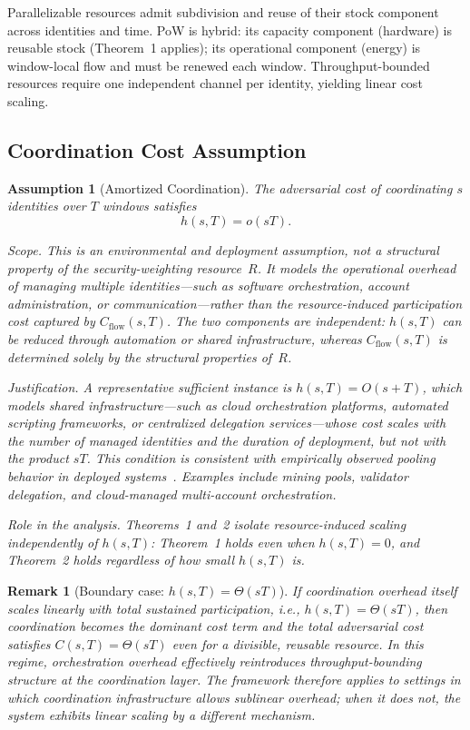 \documentclass[journal]{IEEEtran}
\newtheorem{assumption}{Assumption}
\newtheorem{remark}{Remark}
\begin{document}
	Parallelizable resources admit subdivision and reuse of
	their stock component across identities and time.
	PoW is hybrid: its capacity component (hardware) is reusable
	stock (Theorem~1 applies); its operational component (energy)
	is window-local flow and must be renewed each window.
	Throughput-bounded resources require one independent channel
	per identity, yielding linear cost scaling.
	
	\subsection{Coordination Cost Assumption}
	\begin{assumption}[Amortized Coordination]
		\label{ass:coordination}
		The adversarial cost of coordinating $s$ identities
		over $T$ windows satisfies
		\[
		h(s,T) = o(sT).
		\]
		
		\noindent\textit{Scope.}
		This is an \emph{environmental and deployment assumption},
		not a structural property of the security-weighting resource~$R$.
		It models the operational overhead of managing multiple
		identities---such as software orchestration, account
		administration, or communication---rather than the
		resource-induced participation cost captured by
		$C_{\mathrm{flow}}(s,T)$.
		The two components are independent:
		$h(s,T)$ can be reduced through automation or shared
		infrastructure, whereas $C_{\mathrm{flow}}(s,T)$ is
		determined solely by the structural properties of~$R$.
		
		\noindent\textit{Justification.}
		A representative sufficient instance is $h(s,T) = O(s+T)$,
		which models shared infrastructure---such as cloud
		orchestration platforms, automated scripting frameworks,
		or centralized delegation services---whose cost scales
		with the number of managed identities and the duration
		of deployment, but not with the product $sT$.
		This condition is consistent with empirically observed
		pooling behavior in deployed
		systems~\cite{rosenfeld2011analysis,bonneau2015sok,saleh2021blockchain}.
		Examples include mining pools, validator delegation,
		and cloud-managed multi-account orchestration.
		
		\noindent\textit{Role in the analysis.}
		Theorems~1 and~2 isolate resource-induced scaling
		independently of $h(s,T)$: Theorem~1 holds even when
		$h(s,T)=0$, and Theorem~2 holds regardless of how
		small $h(s,T)$ is.
	\end{assumption}
	
	\begin{remark}[Boundary case: $h(s,T)=\Theta(sT)$]
		If coordination overhead itself scales linearly with
		total sustained participation, i.e., $h(s,T)=\Theta(sT)$,
		then coordination becomes the dominant cost term and
		the total adversarial cost satisfies $C(s,T)=\Theta(sT)$
		even for a divisible, reusable resource.
		In this regime, orchestration overhead effectively
		reintroduces throughput-bounding structure at the
		coordination layer.
		The framework therefore applies to settings in which
		coordination infrastructure allows sublinear overhead;
		when it does not, the system exhibits linear scaling
		by a different mechanism.
	\end{remark}
	
\end{document}
